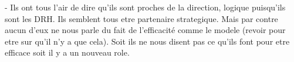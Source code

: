 
- Ils ont tous l'air de dire qu'ils sont proches de la direction, logique puisqu'ils sont les DRH. Ils semblent tous etre partenaire strategique. Mais par contre aucun d'eux ne nous parle du fait de l'efficacité comme le modele (revoir pour etre sur qu'il n'y a que cela). Soit ils ne nous disent pas ce qu'ils font pour etre efficace soit il y a un nouveau role. 